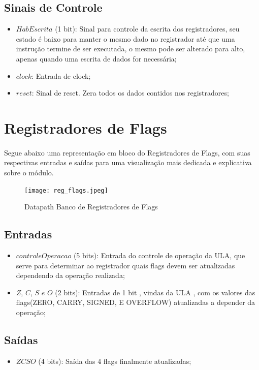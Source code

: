 \documentclass{report}
\begin{document}
\subsection{Sinais de Controle}
\begin{itemize}
\item $HabEscrita$ (1 bit): Sinal para controle da escrita dos registradores, seu estado é baixo para manter o mesmo dado no registrador até que uma instrução termine de ser executada, o mesmo pode ser alterado para alto, apenas quando uma escrita de dados for necessária;
\item $clock$: Entrada de clock;
\item $reset$: Sinal de reset. Zera todos os dados contidos nos registradores;
\end{itemize}
    
\section{Registradores de Flags}
    \paragraph{} 
    Segue abaixo uma representação em bloco do Registradores de Flags, com suas respectivas entradas e saídas para uma visualização mais dedicada e explicativa sobre o módulo. 
    
    \begin{figure}[H] \centering \texttt{[image: reg\_flags.jpeg]}                \caption{Datapath Banco de Registradores de Flags} \label{fig:mesh1} 
    \end{figure}
    
    \subsection{Entradas}
\begin{itemize}
        \item $controleOperacao$ (5 bits): Entrada do controle de operação da ULA, que serve para determinar ao registrador quais flags devem ser atualizadas dependendo da operação realizada;
		\item $Z$, $C$, $S$ $e$ $O$ (2 bits): Entradas de 1 bit , vindas da ULA , com os valores das flags(ZERO, CARRY, SIGNED, E OVERFLOW) atualizadas a depender da operação;
\end{itemize}

\subsection{Saídas}
\begin{itemize}
\item $ZCSO$ (4 bits): Saída das 4 flags finalmente atualizadas;
\end{itemize}
\end{document}
